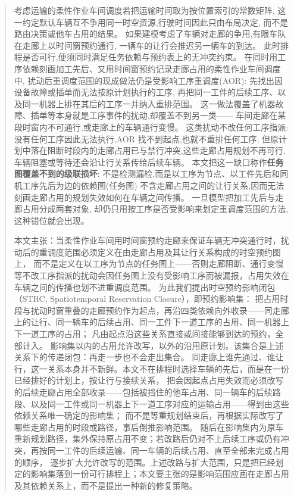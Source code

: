 \documentclass[manuscript,screen,review]{acmart}
\begin{document}
\begin{abstract}
考虑运输的柔性作业车间调度若把运输时间取为按位置索引的常数矩阵,
这一约定默认车辆互不争用同一时空资源,行驶时间因此只由布局决定,
而不是路由决策或他车占用的结果。
如果建模考虑了车辆对走廊的争用,有限车队在走廊上以时间窗预约通行,
一辆车的让行会推迟另一辆车的到达。
此时排程是否可行,便须同时满足任务依赖与预约表上的无冲突约束。
在同时用工序依赖刻画加工先后、又用时间窗预约记录走廊占用的柔性作业车间调度中,
扰动后重调度范围的现成做法仍是受影响工序重调度(AOR):
先找出因设备故障或插单而无法按原计划执行的工序,
再把同一工件的后续工序、以及同一机器上排在其后的工序一并纳入重排范围。
这一做法覆盖了机器故障、插单等本身就是工序事件的扰动,却覆盖不到另一类——
车间走廊在某段时窗内不可通行,或走廊上的车辆通行变慢。
这类扰动不改任何工序指派:没有任何工序因此无法执行,AOR 找不到起点,也就不重排任何工序;
但原计划中落在阻断时段内的走廊占用已与禁行冲突,这些走廊占用规划不再可行,
车辆阻塞或等待还会沿让行关系传给后续车辆。
本文把这一缺口称作\textbf{任务图覆盖不到的级联损坏}:
不是检测漏检,而是以工序为节点、以工件先后和同机工序先后为边的依赖图(任务图)
不含走廊占用之间的让行关系,因而无法刻画走廊占用的规划失效如何在车辆之间传播。
一旦模型把加工先后与走廊占用分成两套对象,
却仍只用按工序是否受影响来划定重调度范围的方法,这种错位就会出现。

本文主张：当柔性作业车间用时间窗预约走廊来保证车辆无冲突通行时，扰动后的重调度范围必须定义在由走廊占用及其让行关系构成的时空预约图上，
而不是定义在以工序为节点的任务图上——否则走廊阻断、通行变慢等不改工序指派的扰动会因任务图上没有受影响工序而被漏报，占用失效在车辆之间的传播也划不进重调度范围。
为此我们提出时空预约影响闭包（STRC, Spatiotemporal Reservation Closure），即预约影响集：
把占用时段与扰动时窗重叠的走廊预约作为起点，再沿四类依赖向外收录——同走廊上的让行、同一辆车的后续占用、同一工件下一道工序的占用、同一机器上下一道工序的占用；
凡由起点沿这些关系直接或间接能够到达的预约，全部计入。
影响集以内的占用允许改写，以外的沿用原计划。该集合是上述关系下的传递闭包：再走一步也不会走出集合。
同走廊上谁先通过、谁让行，这一关系本身并不新鲜。本文不在排程时选择车辆的先后，而是在一份已经排好的计划上，按让行与接续关系，
把会因起点占用失效而必须改写的后续走廊占用全部收录——包括被挡住的他车占用、同一辆车的后续路段、以及同一工件或同一机器上下一道工序对应的运输占用——得到由这些依赖关系唯一确定的影响集；
而不是等重规划结束后，再根据实际改写了哪些走廊占用的时段或路径，事后倒推影响范围。
随后在影响集内为原车重新规划路径，集外保持原占用不变；若改路后仍对不上后续工序或仍有冲突，再按同一工件的后续运输、同一车辆的后续占用、直至全部未完成占用的顺序，
逐步扩大允许改写的范围。上述改路与扩大范围，只是把已经划定的影响集落到一份可行排程上；本文要主张的是影响范围应画在走廊占用及其依赖关系上，而不是提出一种新的修复策略。


\end{abstract}
\end{document}
